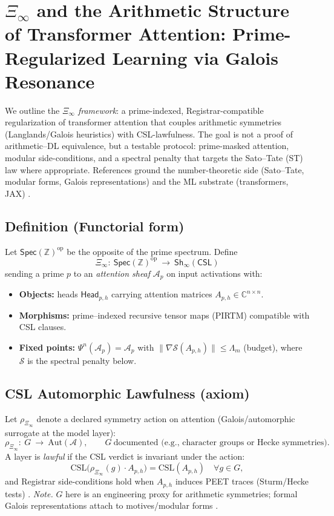 \documentclass[12pt]{amsart}
\theoremstyle{plain}
\begin{document}
\section{$\Xi_\infty$ and the Arithmetic Structure of Transformer Attention: Prime-Regularized Learning via Galois Resonance}

\noindent We outline the \emph{$\Xi_\infty$ framework}: a prime-indexed, Registrar-compatible regularization of transformer attention that couples arithmetic symmetries (Langlands/Galois heuristics) with CSL-lawfulness. The goal is not a proof of arithmetic–DL equivalence, but a testable protocol: prime-masked attention, modular side-conditions, and a spectral penalty that targets the Sato–Tate (ST) law where appropriate. References ground the number-theoretic side (Sato–Tate, modular forms, Galois representations) and the ML substrate (transformers, JAX) \cite{sturm1987congruence,diamond2005first,deligne1971formes,clozel2008satotate,barnet2011st,langlands1970problems,harris2001geometry,katz1999random,vaswani2017attention,bradbury2018jax}.

\subsection{Definition (Functorial form)}
Let $\mathsf{Spec}(\mathbb{Z})^{\mathrm{op}}$ be the opposite of the prime spectrum. Define
\[
\Xi_\infty:\ \mathsf{Spec}(\mathbb{Z})^{\mathrm{op}}\ \longrightarrow\ \mathsf{Sh}_{\infty}(\mathsf{CSL})
\]
sending a prime $p$ to an \emph{attention sheaf} $\mathcal{A}_p$ on input activations with:
\begin{itemize}[noitemsep]
  \item \textbf{Objects:} heads $\mathsf{Head}_{p,h}$ carrying attention matrices $A_{p,h}\in\mathbb{C}^{n\times n}$.
  \item \textbf{Morphisms:} prime–indexed recursive tensor maps (PIRTM) compatible with CSL clauses.
  \item \textbf{Fixed points:} $\Psi^n(\mathcal{A}_p)=\mathcal{A}_p$ with $\|\nabla \mathcal{S}(A_{p,h})\|\le \Lambda_m$ (budget), where $\mathcal{S}$ is the spectral penalty below.
\end{itemize}

\subsection{CSL Automorphic Lawfulness (axiom)}
Let $\rho_{\Xi_\infty}$ denote a declared symmetry action on attention (Galois/automorphic surrogate at the model layer):
\[
\rho_{\Xi_\infty}:\ G\ \longrightarrow\ \mathrm{Aut}(\mathcal{A}),\qquad G\ \text{documented (e.g., character groups or Hecke symmetries)}.
\]
A layer is \emph{lawful} if the CSL verdict is invariant under the action:
\[
\mathrm{CSL}\big(\rho_{\Xi_\infty}(g)\!\cdot\!A_{p,h}\big)=\mathrm{CSL}(A_{p,h})\quad \forall g\in G,
\]
and Registrar side-conditions hold when $A_{p,h}$ induces PEET traces (Sturm/Hecke tests) \cite{sturm1987congruence,diamond2005first}. \emph{Note.} $G$ here is an engineering proxy for arithmetic symmetries; formal Galois representations attach to motives/modular forms \cite{deligne1971formes,harris2001geometry}.
\end{document}
